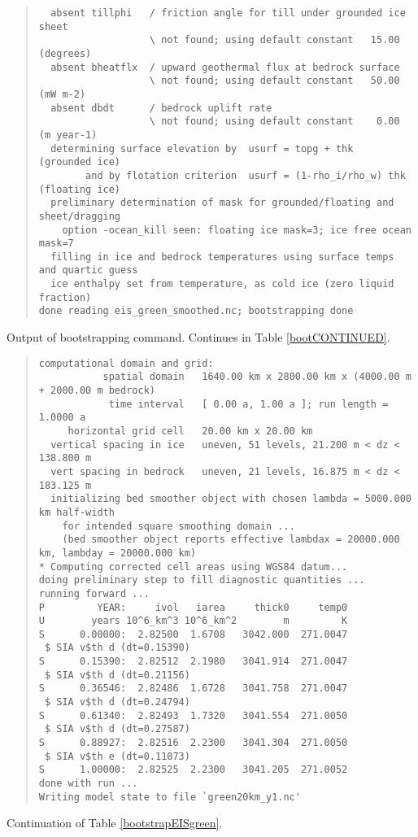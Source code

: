 \begin{table}
\begin{quote}
\begin{verbatim}
  absent tillphi   / friction angle for till under grounded ice sheet            
                   \ not found; using default constant   15.00 (degrees)
  absent bheatflx  / upward geothermal flux at bedrock surface                   
                   \ not found; using default constant   50.00 (mW m-2)
  absent dbdt      / bedrock uplift rate                                         
                   \ not found; using default constant    0.00 (m year-1)
  determining surface elevation by  usurf = topg + thk           (grounded ice)
        and by flotation criterion  usurf = (1-rho_i/rho_w) thk  (floating ice)
  preliminary determination of mask for grounded/floating and sheet/dragging
    option -ocean_kill seen: floating ice mask=3; ice free ocean mask=7
  filling in ice and bedrock temperatures using surface temps and quartic guess
  ice enthalpy set from temperature, as cold ice (zero liquid fraction)
done reading eis_green_smoothed.nc; bootstrapping done
\end{verbatim}
\end{quote}
\normalsize
\bigskip
\caption{Output of bootstrapping command.  Continues in Table \ref{bootCONTINUED}.}
\label{bootstrapEISgreen}
\end{table}

\begin{table}
\centering
\scriptsize
\begin{quote}
\begin{verbatim}
computational domain and grid:
           spatial domain   1640.00 km x 2800.00 km x (4000.00 m + 2000.00 m bedrock)
            time interval   [ 0.00 a, 1.00 a ]; run length = 1.0000 a
     horizontal grid cell   20.00 km x 20.00 km
  vertical spacing in ice   uneven, 51 levels, 21.200 m < dz < 138.800 m
  vert spacing in bedrock   uneven, 21 levels, 16.875 m < dz < 183.125 m
  initializing bed smoother object with chosen lambda = 5000.000 km half-width
    for intended square smoothing domain ...
    (bed smoother object reports effective lambdax = 20000.000 km, lambday = 20000.000 km)
* Computing corrected cell areas using WGS84 datum...
doing preliminary step to fill diagnostic quantities ...
running forward ...
P         YEAR:     ivol   iarea     thick0     temp0
U        years 10^6_km^3 10^6_km^2        m         K
S      0.00000:  2.82500  1.6708   3042.000  271.0047
 $ SIA v$th d (dt=0.15390)
S      0.15390:  2.82512  2.1980   3041.914  271.0047
 $ SIA v$th d (dt=0.21156)
S      0.36546:  2.82486  1.6728   3041.758  271.0047
 $ SIA v$th d (dt=0.24794)
S      0.61340:  2.82493  1.7320   3041.554  271.0050
 $ SIA v$th d (dt=0.27587)
S      0.88927:  2.82516  2.2300   3041.304  271.0050
 $ SIA v$th e (dt=0.11073)
S      1.00000:  2.82525  2.2300   3041.205  271.0052
done with run ... 
Writing model state to file `green20km_y1.nc'
\end{verbatim}
\end{quote}
\normalsize
\bigskip

\caption{Continuation of Table \ref{bootstrapEISgreen}.}
\label{bootCONTINUED}
\end{table}

